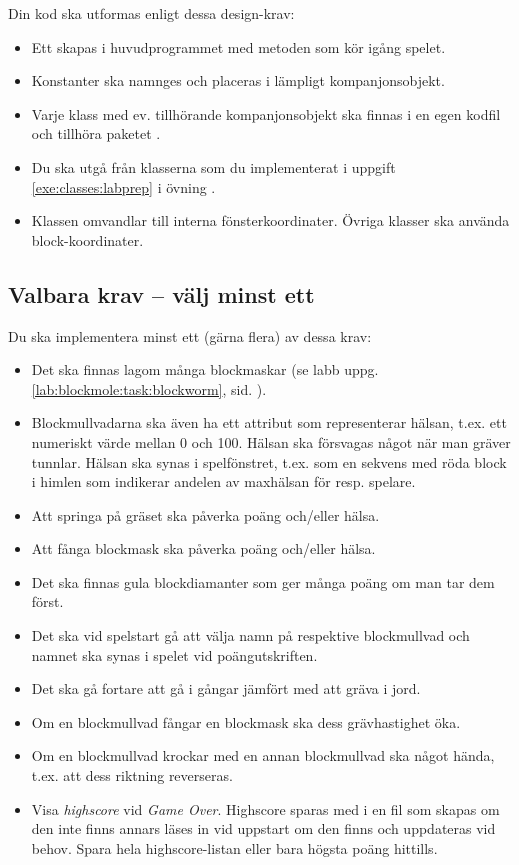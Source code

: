 \noindent Din kod ska utformas enligt dessa design-krav:
\begin{itemize}[nosep, label={$\square$}]
\item Ett  skapas i huvudprogrammet med metoden  som kör igång spelet.
\item Konstanter ska namnges och placeras i lämpligt kompanjonsobjekt.
\item Varje klass med ev. tillhörande kompanjonsobjekt ska finnas i en egen kodfil och tillhöra paketet .
\item Du ska utgå från klasserna som du implementerat i uppgift \ref{exe:classes:labprep} i övning \texttt{\ExeWeekFIVE}.
\item Klassen  omvandlar till interna fönsterkoordinater. Övriga klasser ska använda block-koordinater.
\end{itemize}


\subsection{Valbara krav -- välj minst ett}

Du ska implementera minst ett (gärna flera) av dessa krav:
\begin{itemize}[nosep, label={$\square$}]
\item Det ska finnas lagom många blockmaskar (se labb  uppg. \ref{lab:blockmole:task:blockworm},  sid. \pageref{lab:blockmole:task:blockworm}).
\item Blockmullvadarna ska även ha ett attribut som representerar hälsan, t.ex. ett numeriskt värde mellan 0 och 100. Hälsan ska försvagas något när man gräver tunnlar. Hälsan ska synas i spelfönstret, t.ex. som en sekvens med röda block i himlen som indikerar andelen av maxhälsan för resp. spelare.
\item Att springa på gräset ska påverka poäng och/eller hälsa.
\item Att fånga blockmask ska påverka poäng och/eller hälsa.
\item Det ska finnas gula blockdiamanter som ger många poäng om man tar dem först.
\item Det ska vid spelstart gå att välja namn på respektive blockmullvad och namnet ska synas i spelet vid poängutskriften.
\item Det ska gå fortare att gå i gångar jämfört med att gräva i jord.
\item Om en blockmullvad fångar en blockmask ska dess grävhastighet öka.
\item Om en blockmullvad krockar med en annan blockmullvad ska något hända, t.ex. att dess riktning reverseras.
\item Visa \emph{highscore} vid \emph{Game Over}.  Highscore sparas med  i en fil som skapas om den inte finns annars läses in vid uppstart om den finns och uppdateras vid behov. Spara hela highscore-listan eller bara högsta poäng hittills.
\end{itemize}

